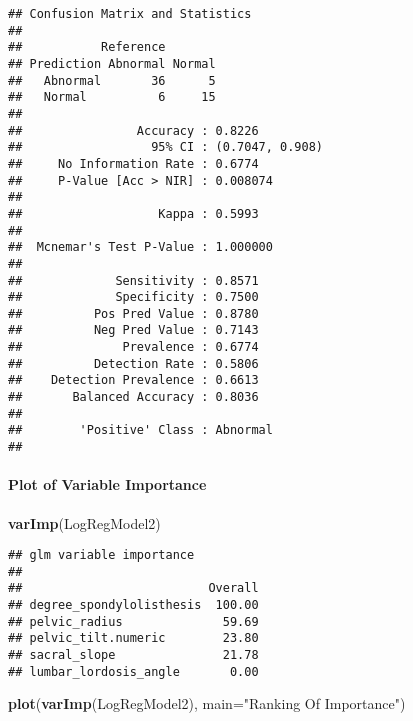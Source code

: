 \documentclass[
]{article}
\newenvironment{Shaded}{\begin{snugshade}}{\end{snugshade}}
\newcommand{\DataTypeTok}[1]{\textcolor[rgb]{0.13,0.29,0.53}{#1}}
\newcommand{\KeywordTok}[1]{\textcolor[rgb]{0.13,0.29,0.53}{\textbf{#1}}}
\newcommand{\NormalTok}[1]{#1}
\newcommand{\StringTok}[1]{\textcolor[rgb]{0.31,0.60,0.02}{#1}}
\begin{document}
\begin{verbatim}
## Confusion Matrix and Statistics
## 
##           Reference
## Prediction Abnormal Normal
##   Abnormal       36      5
##   Normal          6     15
##                                          
##                Accuracy : 0.8226         
##                  95% CI : (0.7047, 0.908)
##     No Information Rate : 0.6774         
##     P-Value [Acc > NIR] : 0.008074       
##                                          
##                   Kappa : 0.5993         
##                                          
##  Mcnemar's Test P-Value : 1.000000       
##                                          
##             Sensitivity : 0.8571         
##             Specificity : 0.7500         
##          Pos Pred Value : 0.8780         
##          Neg Pred Value : 0.7143         
##              Prevalence : 0.6774         
##          Detection Rate : 0.5806         
##    Detection Prevalence : 0.6613         
##       Balanced Accuracy : 0.8036         
##                                          
##        'Positive' Class : Abnormal       
## 
\end{verbatim}

\hypertarget{plot-of-variable-importance-3}{%
\paragraph{Plot of Variable
Importance}\label{plot-of-variable-importance-3}}

\begin{Shaded}
\begin{Highlighting}[]
\KeywordTok{varImp}\NormalTok{(LogRegModel2)}
\end{Highlighting}
\end{Shaded}

\begin{verbatim}
## glm variable importance
## 
##                          Overall
## degree_spondylolisthesis  100.00
## pelvic_radius              59.69
## pelvic_tilt.numeric        23.80
## sacral_slope               21.78
## lumbar_lordosis_angle       0.00
\end{verbatim}

\begin{Shaded}
\begin{Highlighting}[]
\KeywordTok{plot}\NormalTok{(}\KeywordTok{varImp}\NormalTok{(LogRegModel2), }\DataTypeTok{main=}\StringTok{"Ranking Of Importance"}\NormalTok{)}
\end{Highlighting}
\end{Shaded}
\end{document}
